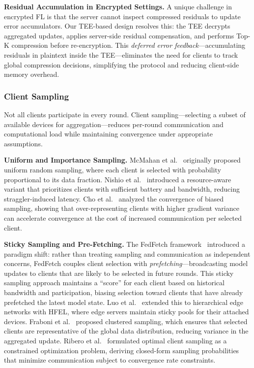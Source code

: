 \textbf{Residual Accumulation in Encrypted Settings.} A unique challenge in encrypted FL is that the server cannot inspect compressed residuals to update error accumulators. Our TEE-based design resolves this: the TEE decrypts aggregated updates, applies server-side residual compensation, and performs Top-K compression before re-encryption. This \textit{deferred error feedback}---accumulating residuals in plaintext inside the TEE---eliminates the need for clients to track global compression decisions, simplifying the protocol and reducing client-side memory overhead.

\subsubsection{Client Sampling}
\label{subsubsec:client-sampling}

Not all clients participate in every round. Client sampling---selecting a subset of available devices for aggregation---reduces per-round communication and computational load while maintaining convergence under appropriate assumptions.

\textbf{Uniform and Importance Sampling.} McMahan et al.~\cite{mcmahan2017communication} originally proposed uniform random sampling, where each client is selected with probability proportional to its data fraction. Nishio et al.~\cite{nishio2019client} introduced a resource-aware variant that prioritizes clients with sufficient battery and bandwidth, reducing straggler-induced latency. Cho et al.~\cite{cho2020client} analyzed the convergence of biased sampling, showing that over-representing clients with higher gradient variance can accelerate convergence at the cost of increased communication per selected client.

\textbf{Sticky Sampling and Pre-Fetching.} The FedFetch framework~\cite{chen2025fedfetch} introduced a paradigm shift: rather than treating sampling and communication as independent concerns, FedFetch couples client selection with \textit{prefetching}---broadcasting model updates to clients that are likely to be selected in future rounds. This sticky sampling approach maintains a ``score'' for each client based on historical bandwidth and participation, biasing selection toward clients that have already prefetched the latest model state. Luo et al.~\cite{luo2022hfel} extended this to hierarchical edge networks with HFEL, where edge servers maintain sticky pools for their attached devices. Fraboni et al.~\cite{fraboni2021clustered} proposed clustered sampling, which ensures that selected clients are representative of the global data distribution, reducing variance in the aggregated update. Ribero et al.~\cite{ribero2022communication} formulated optimal client sampling as a constrained optimization problem, deriving closed-form sampling probabilities that minimize communication subject to convergence rate constraints.

